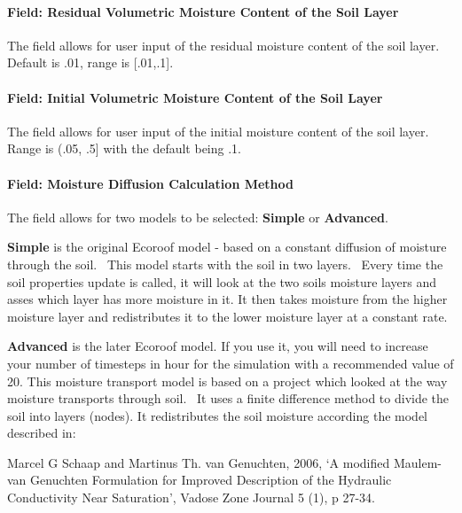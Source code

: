 \paragraph{Field: Residual Volumetric Moisture Content of the Soil Layer}\label{field-residual-volumetric-moisture-content-of-the-soil-layer}

The field allows for user input of the residual moisture content of the soil layer. Default is .01, range is {[}.01,.1{]}.

\paragraph{Field: Initial Volumetric Moisture Content of the Soil Layer}\label{field-initial-volumetric-moisture-content-of-the-soil-layer}

The field allows for user input of the initial moisture content of the soil layer. Range is (.05, .5{]} with the default being .1.

\paragraph{Field: Moisture Diffusion Calculation Method}\label{field-moisture-diffusion-calculation-method}

The field allows for two models to be selected: \textbf{Simple} or \textbf{Advanced}.

\textbf{Simple} is the original Ecoroof model - based on a constant diffusion of moisture through the soil.~ This model starts with the soil in two layers.~ Every time the soil properties update is called, it will look at the two soils moisture layers and asses which layer has more moisture in it. It then takes moisture from the higher moisture layer and redistributes it to the lower moisture layer at a constant rate.

\textbf{Advanced} is the later Ecoroof model. If you use it, you will need to increase your number of timesteps in hour for the simulation with a recommended value of 20. This moisture transport model is based on a project which looked at the way moisture transports through soil.~ It uses a finite difference method to divide the soil into layers (nodes). It redistributes the soil moisture according the model described in:

Marcel G Schaap and Martinus Th. van Genuchten, 2006, `A modified Maulem-van Genuchten Formulation for Improved Description of the Hydraulic Conductivity Near Saturation', Vadose Zone Journal 5 (1), p 27-34.

